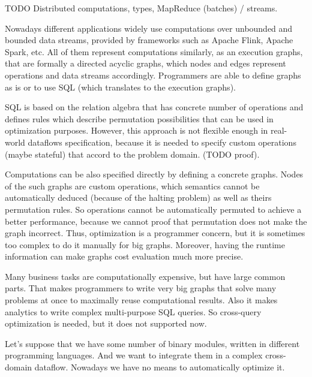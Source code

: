 TODO Distributed computations, types, MapReduce (batches) / streams.

Nowadays different applications widely use computations over unbounded and bounded data streams, provided by frameworks such as Apache Flink, Apache Spark, etc.
All of them represent computations similarly, as an execution graphs, that are formally a directed acyclic graphs, which nodes and edges represent operations and data streams accordingly.
Programmers are able to define graphs as is or to use SQL (which translates to the execution graphs).

SQL is based on the relation algebra that has concrete number of operations and defines rules which describe permutation possibilities that can be used in optimization purposes.
However, this approach is not flexible enough in real-world dataflows specification, because it is needed to specify custom operations (maybe stateful) that accord to the problem domain. (TODO proof).

Computations can be also specified directly by defining a concrete graphs.
Nodes of the such graphs are custom operations, which semantics cannot be automatically deduced (because of the halting problem) as well as theirs permutation rules.
So operations cannot be automatically permuted to achieve a better performance, because we cannot proof that permutation does not make the graph incorrect.
Thus, optimization is a programmer concern, but it is sometimes too complex to do it manually for big graphs.
Moreover, having the runtime information can make graphs cost evaluation much more precise.

Many business tasks are computationally expensive, but have large common parts.
That makes programmers to write very big graphs that solve many problems at once to maximally reuse computational results.
Also it makes analytics to write complex multi-purpose SQL queries.
So cross-query optimization is needed, but it does not supported now.

Let's suppose that we have some number of binary modules, written in different programming languages.
And we want to integrate them in a complex cross-domain dataflow.
Nowadays we have no means to automatically optimize it.


